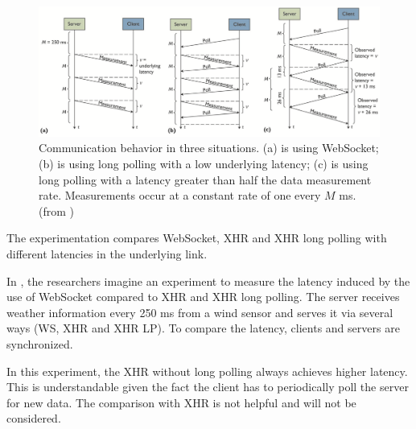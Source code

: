 \documentclass[10pt,journal,compsoc]{IEEEtran}
\newcommand{\ws}{WebSocket}
\begin{document}
\begin{figure}[!t]
    \centering
    \includegraphics[width=\textwidth]{comdisp.png}
    \caption{Communication behavior in three situations. (a) is using \ws{}; (b) is using long polling with a low underlying latency; (c) is using long polling with a latency greater than half the data measurement rate. Measurements occur at a constant rate of one every $M$ ms. (from \cite{communicationAndDIsplayingRealTimeDataWithWebSocket})}
    \label{fig:comdisp}
\end{figure}

The experimentation compares \ws{}, XHR and XHR long polling with different latencies in the underlying link.

In \cite{communicationAndDIsplayingRealTimeDataWithWebSocket}, the researchers imagine an experiment to measure the latency induced by the use of \ws{} compared to XHR and XHR long polling.
The server receives weather information every 250 ms from a wind sensor and serves it via several ways (WS, XHR and XHR LP).
To compare the latency, clients and servers are synchronized.

In this experiment, the XHR without long polling always achieves higher latency.
This is understandable given the fact the client has to periodically poll the server for new data.
The comparison with XHR is not helpful and will not be considered.
\end{document}
